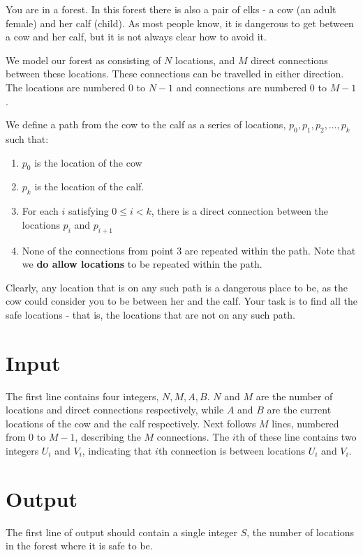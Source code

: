 \noindent
You are in a forest. In this forest there is also a pair of elks 
- a cow (an adult female) and her calf (child). As most 
people know, it is dangerous to get between a cow and her calf, but it is not always clear how to avoid it.

We model our forest as consisting of $N$ locations, and $M$ direct connections 
between these locations. These connections can be travelled in either direction. 
The locations are numbered $0$ to $N-1$ and connections are numbered $0$ to $M-1$.

We define a path from the cow to the calf as a series of locations, $p_0, p_1, p_2, \ldots , p_k$ such that:
\begin{enumerate}
  \item $p_0$ is the location of the cow
  \item $p_k$ is the location of the calf.
  \item For each $i$ satisfying $0 \le i < k$, there is a direct connection between the locations $p_i$ and $p_{i+1}$
  \item None of the connections from point 3 are repeated within the path. Note that we \textbf{do allow locations} to be repeated within the path.
\end{enumerate}

Clearly, any location that is on any such path is a dangerous place to be, 
as the cow could consider you to be between her and the calf. Your task is to find all the safe locations - that is, the locations that are not on any such path.


\section*{Input}
The first line contains four integers, $N, M, A, B$. $N$ and $M$ are the 
number of locations and direct connections respectively, while $A$ and $B$ are the current locations of the cow and the calf respectively.
Next follows $M$ lines, numbered from $0$ to $M-1$, describing the $M$ connections. 
The $i$th of these line contains two integers $U_i$ and $V_i$, indicating that $i$th connection is between locations $U_i$ and $V_i$.

\section*{Output}
The first line of output should contain a single integer $S$, the number of locations in the forest where it is safe to be.

